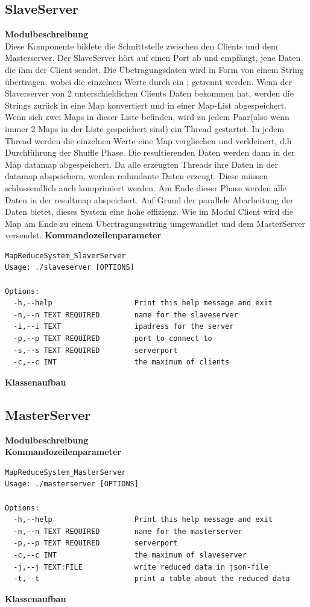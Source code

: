 \documentclass[a4paper,12pt]{article}
\begin{document}
\subsection{SlaveServer}
\textbf{Modulbeschreibung}\\
Diese Komponente bildete die Schnittstelle zwischen den Clients und dem Masterserver. Der SlaveServer hört auf einen Port ab und empfängt, jene Daten die ihm der Client sendet. Die Übetragungsdaten wird in Form von einem String übertragen, wobei die 
einzelnen Werte durch ein ; getrennt werden. Wenn der Slaverserver von 2 unterschieldichen Clients Daten bekommen hat, werden die Strings zurück in eine Map konvertiert und in einer Map-List abgespeichert. Wenn sich zwei Maps in dieser Liste befinden, wird zu jedem Paar(also wenn immer 2 Maps in der Liste gespeichert sind)
ein Thread gestartet. In jedem Thread werden die einzelnen Werte eine Map vergliechen und verkleinert, d.h Durchführung der Shuffle Phase. Die resultierenden Daten werden dann in der Map datamap abgespeichert. Da alle erzeugten Threads ihre Daten in der datamap abspeichern, werden redundante Daten erzeugt. Diese müssen schlussendlich auch komprimiert werden. Am Ende dieser Phase werden alle Daten in der resultmap abspeichert. 
Auf Grund der parallele Abarbeitung der Daten bietet, dieses System eine hohe effizienz. Wie im Modul Client wird die Map am Ende zu einem Übertragungsstring umgewandlet und dem MasterServer versendet.
\textbf{Kommandozeilenparameter}\\
\begin{verbatim}
MapReduceSystem_SlaverServer
Usage: ./slaveserver [OPTIONS]

Options:
  -h,--help                   Print this help message and exit
  -n,--n TEXT REQUIRED        name for the slaveserver
  -i,--i TEXT                 ipadress for the server
  -p,--p TEXT REQUIRED        port to connect to
  -s,--s TEXT REQUIRED        serverport
  -c,--c INT                  the maximum of clients

\end{verbatim}
\textbf{Klassenaufbau}\\
\subsection{MasterServer}
\textbf{Modulbeschreibung}\\
\textbf{Kommandozeilenparameter}\\ 
\begin{verbatim}
MapReduceSystem_MasterServer
Usage: ./masterserver [OPTIONS]

Options:
  -h,--help                   Print this help message and exit
  -n,--n TEXT REQUIRED        name for the masterserver
  -p,--p TEXT REQUIRED        serverport
  -c,--c INT                  the maximum of slaveserver
  -j,--j TEXT:FILE            write reduced data in json-file
  -t,--t                      print a table about the reduced data

\end{verbatim}
\textbf{Klassenaufbau}\\
\end{document}
